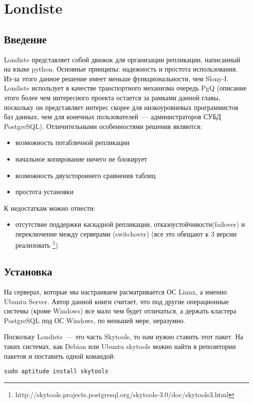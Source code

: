 \section{Londiste}
\label{sec:londiste}
\subsection{Введение}
Londiste представляет собой движок для организации репликации, написанный на языке python. 
Основные принципы: надежность и простота использования. Из-за этого данное решение имеет меньше функциональности, 
чем Slony-I. Londiste использует в качестве транспортного механизма очередь PgQ  (описание этого более чем интересного 
проекта остается за рамками данной главы, поскольку он представляет интерес скорее для низкоуровневых программистов 
баз данных, чем для конечных пользователей~--- администраторов СУБД PostgreSQL). Отличительными особенностями решения являются:
\begin{itemize}
\item возможность потабличной репликации
\item начальное копирование ничего не блокирует
\item возможность двухстороннего сравнения таблиц
\item простота установки
\end{itemize}

К недостаткам можно отнести:
\begin{itemize}
\item отсутствие поддержки каскадной репликации, отказоустойчивости(failover) и переключение между 
серверами (switchover) (все это обещают к 3 версии реализовать
\footnote{http://skytools.projects.postgresql.org/skytools-3.0/doc/skytools3.html})
\end{itemize}


\subsection{Установка}
На серверах, которые мы настраиваем расматривается ОС Linux, а именно Ubuntu Server. 
Автор данной книги считает, что под другие операционные системы (кроме Windows) все мало чем будет отличаться, 
а держать кластера PostgreSQL под ОС Windows, по меньшей мере, неразумно.

Поскольку Londiste~--- это часть Skytools, то нам нужно ставить этот пакет. На таких системах, как Debian или Ubuntu skytools 
можно найти в репозитории пакетов и поставить одной командой:
\begin{lstlisting}[label=lst:londiste1,caption=Установка]
sudo aptitude install skytools
\end{lstlisting}

